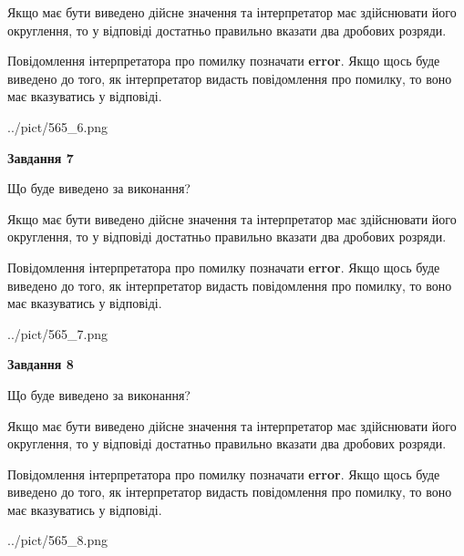 \documentclass[12pt, ukrainian]{article}
\begin{document}
{\begin {Large}
Якщо має бути виведено дійсне значення та інтерпретатор має здійснювати його округлення, 
то у відповіді достатньо правильно вказати два дробових розряди.

Повідомлення інтерпретатора про помилку позначати \textbf{error}.
Якщо щось буде виведено до того, як інтерпретатор видасть повідомлення про помилку, 
то воно має вказуватись у відповіді. \par

\begin{center}
	{../pict/565_6.png}
\end{center}
\newpage

{\begin {center}\textbf{Завдання 7}\end {center}}\par
Що буде виведено за виконання? \par

Якщо має бути виведено дійсне значення та інтерпретатор має здійснювати його округлення, 
то у відповіді достатньо правильно вказати два дробових розряди.

Повідомлення інтерпретатора про помилку позначати \textbf{error}.
Якщо щось буде виведено до того, як інтерпретатор видасть повідомлення про помилку, 
то воно має вказуватись у відповіді. \par

\begin{center}
	{../pict/565_7.png}
\end{center}
\newpage

{\begin {center}\textbf{Завдання 8}\end {center}}\par
Що буде виведено за виконання? \par

Якщо має бути виведено дійсне значення та інтерпретатор має здійснювати його округлення, 
то у відповіді достатньо правильно вказати два дробових розряди.

Повідомлення інтерпретатора про помилку позначати \textbf{error}.
Якщо щось буде виведено до того, як інтерпретатор видасть повідомлення про помилку, 
то воно має вказуватись у відповіді. \par

\begin{center}
	{../pict/565_8.png}
\end{center}
\newpage


\end{Large}}
\end{document}
